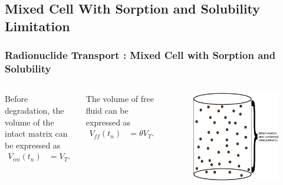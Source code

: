 \subsection{Mixed Cell With Sorption and Solubility Limitation}
\begin{frame}
  \frametitle{Radionuclide Transport : Mixed Cell with Sorption and Solubility}
  \footnotesize{
  \begin{columns}[c]
Before degradation, the volume of the intact matrix can be expressed as
\begin{align}
V_{im}(t_n) &= V_T.
\end{align}

The volume of free fluid can be expressed as
\begin{align}
V_{ff}(t_n) &= \theta V_T .
\end{align}

  \begin{figure}[h!]
    \begin{center}
      \includegraphics[width=\textwidth]{cyder/images/mixed_cell_whole.eps}
    \end{center}
  \end{figure}
\end{columns}
    }
\end{frame}

